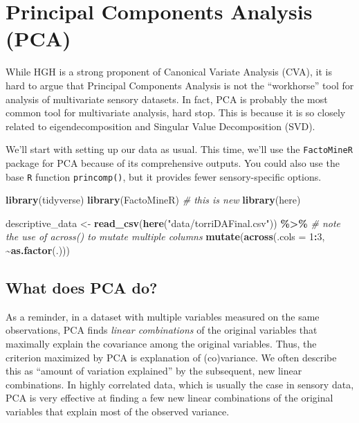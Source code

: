 \documentclass[
]{book}
\newenvironment{Shaded}{\begin{snugshade}}{\end{snugshade}}
\newcommand{\AttributeTok}[1]{\textcolor[rgb]{0.13,0.29,0.53}{#1}}
\newcommand{\CommentTok}[1]{\textcolor[rgb]{0.56,0.35,0.01}{\textit{#1}}}
\newcommand{\DecValTok}[1]{\textcolor[rgb]{0.00,0.00,0.81}{#1}}
\newcommand{\FunctionTok}[1]{\textcolor[rgb]{0.13,0.29,0.53}{\textbf{#1}}}
\newcommand{\NormalTok}[1]{#1}
\newcommand{\OtherTok}[1]{\textcolor[rgb]{0.56,0.35,0.01}{#1}}
\newcommand{\SpecialCharTok}[1]{\textcolor[rgb]{0.81,0.36,0.00}{\textbf{#1}}}
\newcommand{\StringTok}[1]{\textcolor[rgb]{0.31,0.60,0.02}{#1}}
\begin{document}
\chapter{Principal Components Analysis (PCA)}\label{principal-components-analysis-pca}

While HGH is a strong proponent of Canonical Variate Analysis (CVA), it is hard to argue that Principal Components Analysis is not the ``workhorse'' tool for analysis of multivariate sensory datasets. In fact, PCA is probably the most common tool for multivariate analysis, hard stop. This is because it is so closely related to eigendecomposition and Singular Value Decomposition (SVD).

We'll start with setting up our data as usual. This time, we'll use the \texttt{FactoMineR} package for PCA because of its comprehensive outputs. You could also use the base \texttt{R} function \texttt{princomp()}, but it provides fewer sensory-specific options.

\begin{Shaded}
\begin{Highlighting}[]
\FunctionTok{library}\NormalTok{(tidyverse)}
\FunctionTok{library}\NormalTok{(FactoMineR) }\CommentTok{\# this is new}
\FunctionTok{library}\NormalTok{(here)}

\NormalTok{descriptive\_data }\OtherTok{\textless{}{-}} 
  \FunctionTok{read\_csv}\NormalTok{(}\FunctionTok{here}\NormalTok{(}\StringTok{"data/torriDAFinal.csv"}\NormalTok{)) }\SpecialCharTok{\%\textgreater{}\%}
  \CommentTok{\# note the use of across() to mutate multiple columns}
  \FunctionTok{mutate}\NormalTok{(}\FunctionTok{across}\NormalTok{(}\AttributeTok{.cols =} \DecValTok{1}\SpecialCharTok{:}\DecValTok{3}\NormalTok{, }\SpecialCharTok{\textasciitilde{}}\FunctionTok{as.factor}\NormalTok{(.)))}
\end{Highlighting}
\end{Shaded}

\section{What does PCA do?}\label{what-does-pca-do}

As a reminder, in a dataset with multiple variables measured on the same observations, PCA finds \emph{linear combinations} of the original variables that maximally explain the covariance among the original variables. Thus, the criterion maximized by PCA is explanation of (co)variance. We often describe this as ``amount of variation explained'' by the subsequent, new linear combinations. In highly correlated data, which is usually the case in sensory data, PCA is very effective at finding a few new linear combinations of the original variables that explain most of the observed variance.
\end{document}
